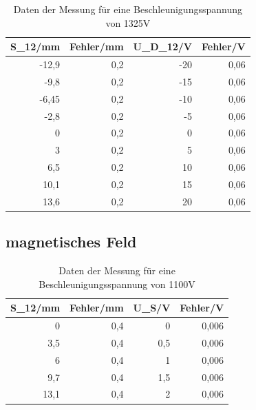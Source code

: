 \documentclass[12pt]{scrartcl}
\begin{document}
\begin{table}[htbp]
\caption{Daten der Messung für eine Beschleunigungsspannung von 1325V}
\begin{center}
\begin{tabular}{|r|r|r|r|}
\hline
\multicolumn{1}{|l|}{S\_12/mm} & \multicolumn{1}{l|}{Fehler/mm} & \multicolumn{1}{l|}{U\_D\_12/V} & \multicolumn{1}{l|}{Fehler/V} \\ \hline
-12,9 & 0,2 & -20 & 0,06 \\ \hline
-9,8 & 0,2 & -15 & 0,06 \\ \hline
-6,45 & 0,2 & -10 & 0,06 \\ \hline
-2,8 & 0,2 & -5 & 0,06 \\ \hline
0 & 0,2 & 0 & 0,06 \\ \hline
3 & 0,2 & 5 & 0,06 \\ \hline
6,5 & 0,2 & 10 & 0,06 \\ \hline
10,1 & 0,2 & 15 & 0,06 \\ \hline
13,6 & 0,2 & 20 & 0,06 \\ \hline
\end{tabular}
\end{center}
\label{tab:materialeigenschaften}
\end{table}

\newpage

\subsection{magnetisches Feld}


\begin{table}[htbp]
\caption{Daten der Messung für eine Beschleunigungsspannung von 1100V}
\begin{center}
\begin{tabular}{|r|r|r|r|}
\hline
\multicolumn{1}{|l|}{S\_12/mm} & \multicolumn{1}{l|}{Fehler/mm} & \multicolumn{1}{l|}{U\_S/V} & \multicolumn{1}{l|}{Fehler/V} \\ \hline
0 & 0,4 & 0 & 0,006 \\ \hline
3,5 & 0,4 & 0,5 & 0,006 \\ \hline
6 & 0,4 & 1 & 0,006 \\ \hline
9,7 & 0,4 & 1,5 & 0,006 \\ \hline
13,1 & 0,4 & 2 & 0,006 \\ \hline
\end{tabular}
\end{center}
\label{tab:materialeigenschaften}
\end{table}
\end{document}
